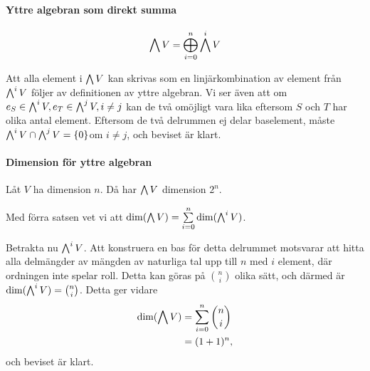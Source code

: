 \paragraph{Yttre algebran som direkt summa}
\begin{align*}
	\bigwedge V = \bigoplus\limits_{i = 0}^{n}\bigwedge^{i}V
\end{align*}

\proof
Att alla element i $\bigwedge V$ kan skrivas som en linjärkombination av element från $\bigwedge^{i}V$ följer av definitionen av yttre algebran. Vi ser även att om $e_{S}\in\bigwedge^{i}V, e_{T}\in\bigwedge^{j}V, i\neq j$ kan de två omöjligt vara lika eftersom $S$ och $T$ har olika antal element. Eftersom de två delrummen ej delar baselement, måste $\bigwedge^{i}V\cap\bigwedge^{j}V = \{0\}$om $i\neq j$, och beviset är klart.

\paragraph{Dimension för yttre algebran}
Låt $V$ ha dimension $n$. Då har $\bigwedge V$ dimension $2^{n}$.

\proof
Med förra satsen vet vi att $\text{dim}(\bigwedge V) = \sum\limits_{i = 0}^{n}\text{dim}(\bigwedge^{i}V)$. 

Betrakta nu $\bigwedge^{i}V$. Att konstruera en bas för detta delrummet motsvarar att hitta alla delmängder av mängden av naturliga tal upp till $n$ med $i$ element, där ordningen inte spelar roll. Detta kan göras på $n\choose i$ olika sätt, och därmed är $\text{dim}(\bigwedge^{i}V) = {n\choose i}$. Detta ger vidare
\begin{align*}
	\text{dim}(\bigwedge V) &= \sum\limits_{i = 0}^{n}{n\choose i} \\
	               &= (1 + 1)^{n},
\end{align*}
och beviset är klart.